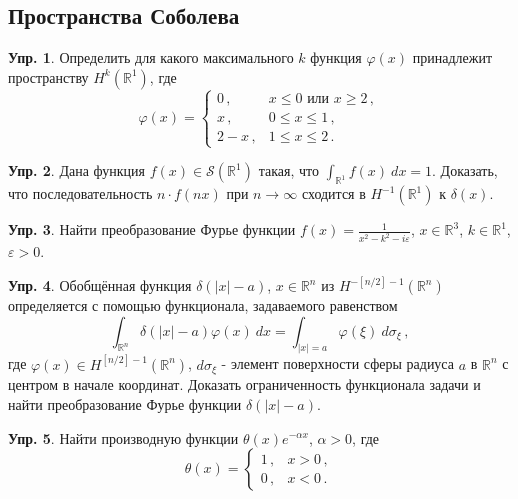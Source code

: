 \documentclass[a4paper, 12pt]{article}
\theoremstyle{definition}
\newtheorem{exercise}{Упр.}
\begin{document}
\subsection{Пространства Соболева} %

\begin{exercise} %
    Определить для какого максимального \({ k }\) функция \({ \varphi(x) }\) принадлежит пространству \({ H^{k}(\mathbb R^{1}) }\), где \[
        \varphi(x) = \begin{cases}
            0\,, & x \leqslant 0 \text{ или } x \geqslant 2\,, \\
            x\,, & 0 \leqslant x \leqslant 1\,, \\
            2 - x\,, & 1 \leqslant x \leqslant 2\,.
        \end{cases}
    \]
\end{exercise}

\begin{exercise} %
    Дана функция \({ f(x) \in \mathcal S(\mathbb R^{1}) }\)  такая, что \({ \int_{\mathbb R^{1}} f(x)\: dx = 1 }\). Доказать, что последовательность \({ n \cdot f(nx) }\) при \({ n \to \infty }\) сходится в \({ H^{-1}(\mathbb R^{1}) }\) к \({ \delta(x) }\).
\end{exercise}

\begin{exercise} %
    Найти преобразование Фурье функции \({ f(x) = \frac{1}{x^2 - k^2 - i\varepsilon} }\), \({ x \in \mathbb R^{3} }\), \({ k \in \mathbb R^{1} }\), \({ \varepsilon > 0 }\).
\end{exercise}

\begin{exercise} %
    Обобщённая функция \({ \delta(\lvert x \rvert - a) }\), \({ x \in \mathbb R^{n} }\) из \({ H^{-[n/2]-1}(\mathbb R^{n}) }\) определяется с помощью функционала, задаваемого равенством \[
        \int_{\mathbb R^{n}}  \delta(\lvert x \rvert - a) \varphi(x)\: dx = \int_{\lvert x \rvert = a} \varphi(\xi)\: d\sigma_{\xi}\,,
    \] где \({ \varphi(x) \in H^{[n / 2]-1}(\mathbb R^{n}) }\), \({ d\sigma_{\xi} }\) - элемент поверхности сферы радиуса \({ a }\) в \({ \mathbb R^{n} }\) с центром в начале координат. Доказать ограниченность функционала задачи и найти преобразование Фурье функции \({ \delta(\lvert x \rvert - a) }\).
\end{exercise}

\begin{exercise} %
    Найти производную функции \({ \theta(x) e^{-\alpha x} }\), \({ \alpha > 0 }\), где \[
        \theta(x) = \begin{cases}
            1\,, & x > 0\,, \\
            0\,, & x < 0\,.
        \end{cases}
    \]
\end{exercise}
\end{document}
